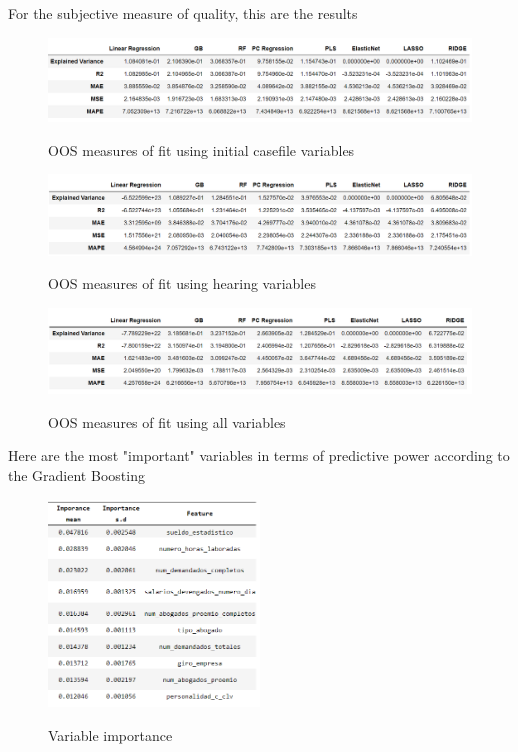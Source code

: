 \documentclass[oneside,11pt]{article}
\begin{document}
For the subjective measure of quality, this are the results

\begin{figure}[H]%
 \centering
 \caption{OOS measures of fit using initial casefile variables}
 \includegraphics[width=\textwidth]{Figuras/oos_X_p3.png}
 \label{fig:3}
\end{figure}

\begin{figure}[H]%
 \centering
 \caption{OOS measures of fit using hearing variables}
 \includegraphics[width=\textwidth]{Figuras/oos_Z_p3.png}
 \label{fig:3}
\end{figure}


\begin{figure}[H]%
 \centering
 \caption{OOS measures of fit using all variables}
 \includegraphics[width=\textwidth]{Figuras/oos_W_p3.png}
 \label{fig:3}
\end{figure}

Here are the most "important" variables in terms of predictive power according to the Gradient Boosting

\begin{figure}[H]%
 \centering
 \caption{Variable importance}
 \includegraphics[width=0.5\textwidth]{Figuras/importance.png}
 \label{fig:3}
\end{figure}
\end{document}
